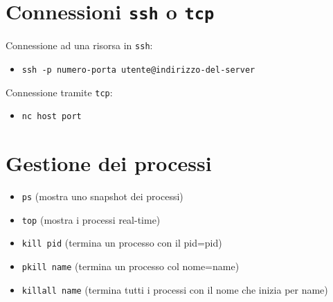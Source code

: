 \section{Connessioni \texttt{ssh} o \texttt{tcp}}
Connessione ad una risorsa in \texttt{ssh}:

\begin{itemize}
    \item \texttt{ssh -p numero-porta utente@indirizzo-del-server}
\end{itemize}

Connessione tramite \texttt{tcp}:

\begin{itemize}
    \item \texttt{nc host port}
\end{itemize}

\section{Gestione dei processi}
\begin{itemize}
    \item \texttt{ps} (mostra uno snapshot dei processi)
    \item \texttt{top} (mostra i processi real-time)
    \item \texttt{kill pid} (termina un processo con il pid=pid)
    \item \texttt{pkill name} (termina un processo col nome=name)
    \item \texttt{killall name} (termina tutti i processi con il nome che inizia per name)
\end{itemize}